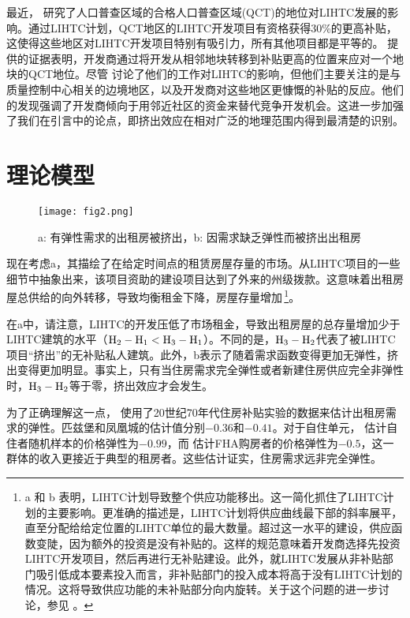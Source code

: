 \documentclass[lang=cn,11pt,a4paper]{paper}
\begin{document}
最近，\cite{Baum-Snow2009654} 研究了人口普查区域的合格人口普查区域(QCT)的地位对LIHTC发展的影响。通过LIHTC计划，QCT地区的LIHTC开发项目有资格获得30\%的更高补贴，这使得这些地区对LIHTC开发项目特别有吸引力，所有其他项目都是平等的。\cite{Baum-Snow2009654} 提供的证据表明，开发商通过将开发从相邻地块转移到补贴更高的位置来应对一个地块的QCT地位。尽管 \cite{Baum-Snow2009654} 讨论了他们的工作对LIHTC的影响，但他们主要关注的是与质量控制中心相关的边境地区，以及开发商对这些地区更慷慨的补贴的反应。他们的发现强调了开发商倾向于用邻近社区的资金来替代竞争开发机会。这进一步加强了我们在引言中的论点，即挤出效应在相对广泛的地理范围内得到最清楚的识别。

\section{理论模型}\label{sec3}

\begin{figure}[h]
	\centering
	\texttt{[image: fig2.png]}
	\caption{a: 有弹性需求的出租房被挤出，b: 因需求缺乏弹性而被挤出出租房}\label{fig2}
\end{figure}

现在考虑a，其描绘了在给定时间点的租赁房屋存量的市场。从LIHTC项目的一些细节中抽象出来，该项目资助的建设项目达到了外来的州级拨款。这意味着出租房屋总供给的向外转移，导致均衡租金下降，房屋存量增加\,\footnote{a 和 b 表明，LIHTC计划导致整个供应功能移出。这一简化抓住了LIHTC计划的主要影响。更准确的描述是，LIHTC计划将供应曲线最下部的斜率展平，直至分配给给定位置的LIHTC单位的最大数量。超过这一水平的建设，供应函数变陡，因为额外的投资是没有补贴的。这样的规范意味着开发商选择先投资LIHTC开发项目，然后再进行无补贴建设。此外，就LIHTC发展从非补贴部门吸引低成本要素投入而言，非补贴部门的投入成本将高于没有LIHTC计划的情况。这将导致供应功能的未补贴部分向内旋转。关于这个问题的进一步讨论，参见 \cite{Olsen2007618}。}。

在a中，请注意，LIHTC的开发压低了市场租金，导致出租房屋的总存量增加少于LIHTC建筑的水平（$\rm{H}_2-\rm{H}_1 < \rm{H}_3-\rm{H}_1$）。不同的是，$\rm{H}_3-\rm{H}_2$代表了被LIHTC项目“挤出”的无补贴私人建筑。此外，b表示了随着需求函数变得更加无弹性，挤出变得更加明显。事实上，只有当住房需求完全弹性或者新建住房供应完全非弹性时，$\rm{H}_3-\rm{H}_2$等于零，挤出效应才会发生。

为了正确理解这一点，\cite{Hanushek1980449} 使用了20世纪70年代住房补贴实验的数据来估计出租房需求的弹性。匹兹堡和凤凰城的估计值分别$-0.36$和$-0.41$。对于自住单元，\cite{Rosen19791} 估计自住者随机样本的价格弹性为$-0.99$，而 \cite{Rosen19791} 估计FHA购房者的价格弹性为$-0.5$，这一群体的收入更接近于典型的租房者。这些估计证实，住房需求远非完全弹性。
\end{document}
